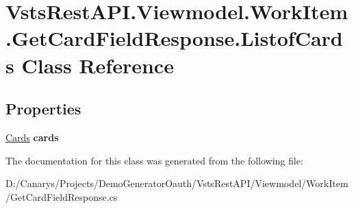 \hypertarget{class_vsts_rest_a_p_i_1_1_viewmodel_1_1_work_item_1_1_get_card_field_response_1_1_listof_cards}{}\section{Vsts\+Rest\+A\+P\+I.\+Viewmodel.\+Work\+Item.\+Get\+Card\+Field\+Response.\+Listof\+Cards Class Reference}
\label{class_vsts_rest_a_p_i_1_1_viewmodel_1_1_work_item_1_1_get_card_field_response_1_1_listof_cards}
\subsection*{Properties}
\begin{DoxyCompactItemize}
\item 
\mbox{\label{class_vsts_rest_a_p_i_1_1_viewmodel_1_1_work_item_1_1_get_card_field_response_1_1_listof_cards_a9a757939b4aef47eb51a15d0edcf6d8b}} 
\mbox{\hyperlink{class_vsts_rest_a_p_i_1_1_viewmodel_1_1_work_item_1_1_get_card_field_response_1_1_cards}{Cards}} {\bfseries cards}
\end{DoxyCompactItemize}


The documentation for this class was generated from the following file\+:\begin{DoxyCompactItemize}
\item 
D\+:/\+Canarys/\+Projects/\+Demo\+Generator\+Oauth/\+Vsts\+Rest\+A\+P\+I/\+Viewmodel/\+Work\+Item/Get\+Card\+Field\+Response.\+cs\end{DoxyCompactItemize}
